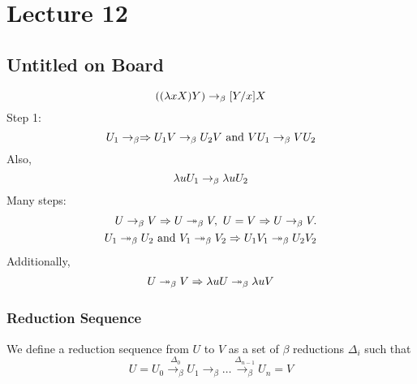 \chapter{Lecture 12}
\def\over#1#2{#1}
\def\LeftRightarrow{\Leftarrow\Rightarrow}

\pagestyle{fancy}

\section{Untitled on Board}
\begin{equation*}
  ((\lambda x X)Y) \rightarrow_\beta [Y/x]X
\end{equation*}
Step 1:
\begin{equation*}
  U_1 \rightarrow_\beta \Rightarrow U_1V \rightarrow_\beta U_2V \hbox{ and } VU_1 \rightarrow_\beta VU_2
\end{equation*}
Also,
\begin{equation*}
  \lambda uU_1 \rightarrow_\beta \lambda uU_2
\end{equation*}
Many steps:
\begin{eqnarray*}
  U \rightarrow_\beta V \Rightarrow U \twoheadrightarrow_\beta V,\ U = V \Rightarrow U \rightarrow_\beta V.\\
  U_1 \twoheadrightarrow_\beta U_2 \hbox{ and } V_1 \twoheadrightarrow_\beta V_2 \Rightarrow U_1V_1 \twoheadrightarrow_\beta U_2V_2\\
\end{eqnarray*}
Additionally,
\begin{eqnarray*}
  U \twoheadrightarrow_\beta V \Rightarrow \lambda uU \twoheadrightarrow_\beta \lambda uV\\
\end{eqnarray*}

\subsection{Reduction Sequence}
We define a reduction sequence from $U$ to $V$ as a set of $\beta$ reductions $\Delta_i$ such that
\begin{equation*}
  U = U_0 \stackrel{\Delta_0}{\rightarrow_\beta} U_1 \rightarrow_\beta \ldots \stackrel{\Delta_{n-1}}{\rightarrow_\beta} U_n = V
\end{equation*}

